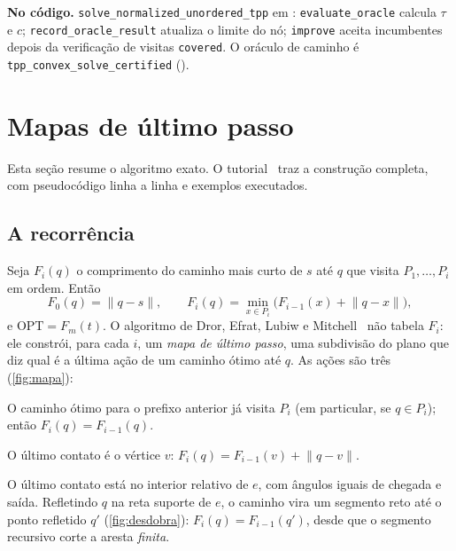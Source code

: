 \documentclass[11pt,a4paper]{article}
\theoremstyle{plain}\newtheorem{proposicao}{Proposição}
\theoremstyle{definition}\newtheorem{definicao}{Definição}
\theoremstyle{plain}\newtheorem{teorema}{Teorema}
\newcommand{\norm}[1]{\lVert#1\rVert}
\newcommand{\OPT}{\mathrm{OPT}}
\newcommand{\code}[1]{\texttt{\small #1}}
\begin{document}
\begin{fonte}
\textbf{No código.} \code{solve\_normalized\_unordered\_tpp} em : \code{evaluate\_oracle} calcula \(\tau\) e \(c\); \code{record\_oracle\_result} atualiza o limite do nó; \code{improve} aceita incumbentes depois da verificação de visitas \code{covered}. O oráculo de caminho é \code{tpp\_convex\_solve\_certified} ().
\end{fonte}

\section{Mapas de último passo}\label{sec:mapas}
Esta seção resume o algoritmo exato. O tutorial~\cite{tutorial} traz a construção completa, com pseudocódigo linha a linha e exemplos executados.

\subsection{A recorrência}
Seja \(F_i(q)\) o comprimento do caminho mais curto de \(s\) até \(q\) que visita \(P_1,\dots,P_i\) em ordem. Então
\begin{equation}\label{eq:recorrencia}
F_0(q)=\norm{q-s},\qquad F_i(q)=\min_{x\in P_i}\bigl(F_{i-1}(x)+\norm{q-x}\bigr),
\end{equation}
e \(\OPT=F_m(t)\). O algoritmo de Dror, Efrat, Lubiw e Mitchell~\cite{dror} não tabela \(F_i\): ele constrói, para cada \(i\), um \emph{mapa de último passo}, uma subdivisão do plano que diz qual é a última ação de um caminho ótimo até \(q\). As ações são três (\cref{fig:mapa}):
\begin{description}[leftmargin=0pt,itemsep=1pt,font=\bfseries\color{navy}]
\item[Atravessar.] O caminho ótimo para o prefixo anterior já visita \(P_i\) (em particular, se \(q\in P_i\)); então \(F_i(q)=F_{i-1}(q)\).
\item[Dobrar num vértice \(v\).] O último contato é o vértice \(v\): \(F_i(q)=F_{i-1}(v)+\norm{q-v}\).
\item[Refletir numa aresta \(e\).] O último contato está no interior relativo de \(e\), com ângulos iguais de chegada e saída. Refletindo \(q\) na reta suporte de \(e\), o caminho vira um segmento reto até o ponto refletido \(q'\) (\cref{fig:desdobra}): \(F_i(q)=F_{i-1}(q')\), desde que o segmento recursivo corte a aresta \emph{finita}.
\end{description}
\end{document}
